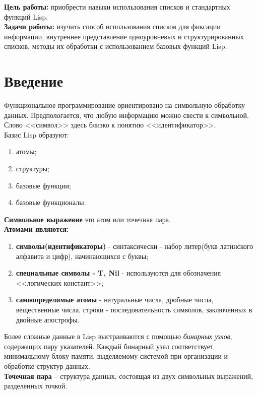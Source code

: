 \documentclass[a4paper, 12pt]{article}
\begin{document}
\tableofcontents
\clearpage
\newpage

\textbf{Цель работы:} приобрести навыки использования списков и стандартных функций Lisp.
\\ \hspace*{5mm} \textbf{Задачи работы:} изучить способ использования списков для фиксации информации, внутреннее представление одноуровневых и структурированных списков, методы их обработки с использованием базовых функций Lisp.


\section*{Введение}


	\hspace*{5mm} Функциональное программирование ориентировано на символьную обработку данных. Предпологается, что любую информацию можно свести к символьной. Слово <<символ>> здесь близко к понятию <<идентификатор>>.
	\\ Базис Lisp образуют:
	\begin{enumerate}
		\item атомы;
		\item структуры;
		\item базовые функции;
		\item базовые функционалы.
	\end{enumerate}
	\textbf{Символьное выражение} это атом или точечная пара.
	\\ \textbf{Атомами являются:} 
	\begin{enumerate}
		\item \textbf{символы(идентификаторы)} - синтаксически - набор литер(букв латинского алфавита и цифр), начинающихся с буквы;
		\item \textbf{специальные символы - {T, Nil}} - используются для обозначения <<логических констант>>;
		\item \textbf{самоопределимые атомы} - натуральные числа, дробные числа, вещественные числа, строки - последовательность символов, заключенных в двойные апострофы.
	\end{enumerate}
	\hspace*{5mm} Более сложные данные в Lisp выстраиваются с помощью \textit{бинарных узлов}, содержащих пару указателей. Каждый бинарный узел соответствует минимальному блоку памяти, выделяемому системой при организации и обработке структур данных.\cite{com}
	\\ \hspace*{5mm} \textbf{Точечная пара} – структура данных, состоящая из двух символьных выражений, разделенных точкой.
\end{document}
